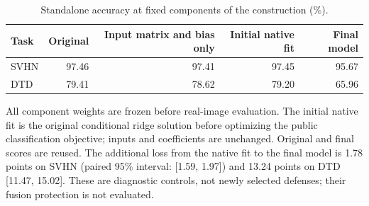 \begin{table}[t]
\centering\small
\caption{Standalone accuracy at fixed components of the construction (\%).}
\label{tab:noise-native-components}
\begin{tabular}{lrrrr}
\toprule
Task & Original & Input matrix and bias only & Initial native fit & Final model \\
\midrule
SVHN & 97.46 & 97.41 & 97.45 & 95.67 \\
DTD & 79.41 & 78.62 & 79.20 & 65.96 \\
\bottomrule
\end{tabular}
\par\smallskip
\begin{minipage}{\textwidth}\footnotesize
All component weights are frozen before real-image evaluation. The initial native fit is the original conditional ridge solution before optimizing the public classification objective; inputs and coefficients are unchanged. Original and final scores are reused. The additional loss from the native fit to the final model is 1.78 points on SVHN (paired 95\% interval: [1.59, 1.97]) and 13.24 points on DTD [11.47, 15.02]. These are diagnostic controls, not newly selected defenses; their fusion protection is not evaluated.
\end{minipage}
\end{table}

